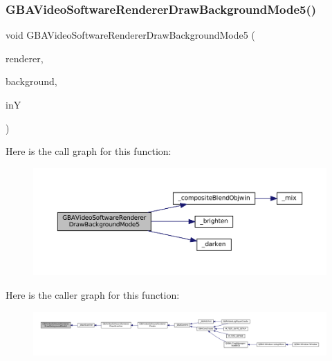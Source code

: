 \subsubsection{\texorpdfstring{G\+B\+A\+Video\+Software\+Renderer\+Draw\+Background\+Mode5()}{GBAVideoSoftwareRendererDrawBackgroundMode5()}}
{\footnotesize\ttfamily void G\+B\+A\+Video\+Software\+Renderer\+Draw\+Background\+Mode5 (\begin{DoxyParamCaption}\item[{struct G\+B\+A\+Video\+Software\+Renderer $\ast$}]{renderer,  }\item[{struct G\+B\+A\+Video\+Software\+Background $\ast$}]{background,  }\item[{\mbox{\hyperlink{ioapi_8h_a787fa3cf048117ba7123753c1e74fcd6}{int}}}]{inY }\end{DoxyParamCaption})}

Here is the call graph for this function\+:
\nopagebreak
\begin{figure}[H]
\begin{center}
\leavevmode
\includegraphics[width=350pt]{software-bg_8c_a9d87077d27cf5f313462c78d226d1956_cgraph}
\end{center}
\end{figure}
Here is the caller graph for this function\+:
\nopagebreak
\begin{figure}[H]
\begin{center}
\leavevmode
\includegraphics[width=350pt]{software-bg_8c_a9d87077d27cf5f313462c78d226d1956_icgraph}
\end{center}
\end{figure}
